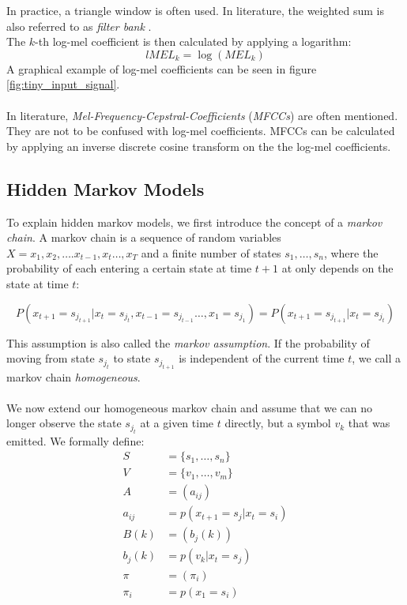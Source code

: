 In practice, a triangle window is often used. In literature, the weighted sum is also referred to as \textit{filter bank} \cite{zhan1997vocal}. \\
The $k$-th log-mel coefficient is then calculated by applying a logarithm:
\[
lMEL_k = \log(MEL_k) 
\]
A graphical example of log-mel coefficients can be seen in figure \ref{fig:tiny_input_signal}.
\\ \\
In literature, \textit{Mel-Frequency-Cepstral-Coefficients} (\textit{MFCCs}) are often mentioned. They are not to be confused with log-mel coefficients. MFCCs can be calculated by applying an inverse discrete cosine transform on the the log-mel coefficients.


\subsection{Hidden Markov Models}
To explain hidden markov models, we first introduce the concept of a \textit{markov chain}. A markov chain is a sequence of random variables $X = x_1, x_2, \dots. x_{t - 1}, x_{t} \dots, x_T$ and a finite number of states $s_1, \dots, s_n$, where the probability of each entering a certain state at time $t + 1$ at only depends on the state at time $t$:

\[
P(x_{t + 1} = s_{j_{t + 1}} | x_{t} = s_{j_t}, x_{t - 1} = s_{j_{t - 1}} \dots, x_{1} = s_{j_{1}}) = P(x_{t + 1} = s_{j_{t + 1}} | x_{t} = s_{j_t})
\] 

This assumption is also called the \textit{markov assumption}. If the probability of moving from state $s_{j_t}$ to state $s_{j_{t + 1}}$ is independent of the current time $t$, we call a markov chain \textit{homogeneous}. \\ \\
We now extend our homogeneous markov chain and assume that we can no longer observe the state $s_{j_t}$ at a given time $t$ directly, but a symbol $v_k$ that was emitted. We formally define: 
\begin{align*}
S &= \{s_1, \dots, s_n\} \tag{states} \\
V &= \{v_1, \dots, v_m\} \tag{symbols} \\
A &= (a_{ij}) \tag{state tansmission probability} \\
a_{ij} &= p(x_{t+1} = s_j | x_{t} = s_i) \\
B(k) &= (b_j(k)) \tag{emisson probability} \\
b_j(k) &= p(v_k | x_t = s_j) \\
\pi &= (\pi_i) \tag{initial state probability} \\
\pi_i &= p(x_1 = s_i)
\end{align*}

